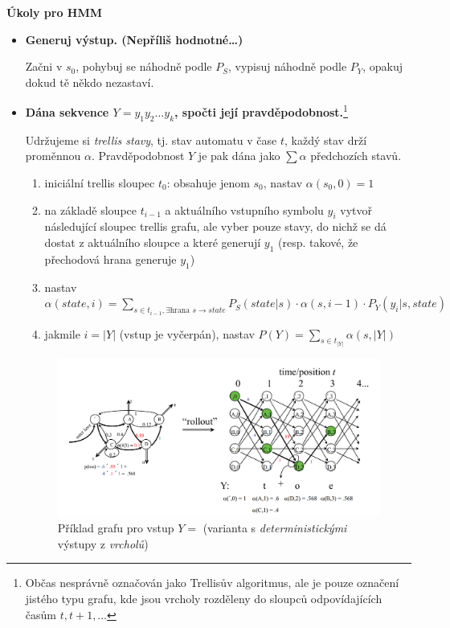 \documentclass[11pt]{report} %
\numberwithin{equation}{section}
\begin{document}
\medskip
\textbf{Úkoly pro HMM}
\begin{itemize}
	
	
	\item\textbf{Generuj výstup. (Nepříliš hodnotné\dots)} 
	
	Začni v $s_0$, pohybuj se náhodně podle $P_S$, vypisuj náhodně podle $P_Y$, opakuj dokud tě někdo nezastaví.
	
	\item \textbf{Dána sekvence $Y = y_1y_2\dots y_k$, spočti její pravděpodobnost.}\footnote{Občas nesprávně označován jako Trellisův algoritmus, ale  je pouze označení jistého typu grafu, kde jsou vrcholy rozděleny do sloupců odpovídajících časům $t, t+1,\dots$}
	
	Udržujeme si \textit{trellis stavy}, tj. stav automatu v čase $t$, každý stav drží proměnnou $\alpha$. Pravděpodobnost $Y$ je pak dána jako $\sum\alpha$ předchozích stavů.
	\begin{enumerate}
		
		
		\item iniciální trellis sloupec $t_0$: obsahuje jenom $s_0$, nastav $\alpha(s_0, 0) = 1$
		\item na základě sloupce $t_{i-1}$ a aktuálního vstupního symbolu $y_i$ vytvoř následující sloupec trellis grafu, ale vyber pouze stavy, do nichž se dá dostat z aktuálního sloupce a které generují $y_1$ (resp. takové, že přechodová hrana generuje $y_1$)
		\item nastav $\alpha(state,i) = \sum\limits_{s \in t_{i-1}, \exists\text{hrana }s\rightarrow state} P_S(state|s) \cdot \alpha(s, i-1) \cdot P_Y(y_i|s,state)$
		\item jakmile $i = |Y|$ (vstup je vyčerpán), nastav $P(Y) = \sum\limits_{s \in t_{|Y|}} \alpha(s,|Y|)$	
	\end{enumerate}
	
	\begin{figure}[H]
		\centering
		\includegraphics[scale=1]{img/trellis.png}
		\captionsetup{width=0.6\textwidth}
		\caption{Příklad  grafu pro vstup $Y =$  (varianta s \textit{deterministickými} výstupy z \textit{vrcholů})}
	\end{figure}
	

\end{itemize}
\end{document}
